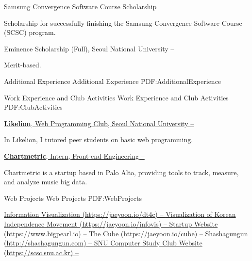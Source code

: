 \documentclass[letterpaper,MMMyyyy,nonstopmode]{template}
\begin{document}
\begin{Body}
\Gap
\BulletItem
Samsung Convergence Software Course Scholarship
\hfill
{}
\begin{Detail}
\Item
Scholarship for successfully finishing the Samsung Convergence Software Course (SCSC) program.
\end{Detail}

\Gap
\BulletItem
Eminence Scholarship (Full),
Seoul National University
\hfill
{} --
\begin{Detail}
\Item
Merit-based.
\end{Detail}


\Section
{Additional Experience}
{Additional Experience}
{PDF:AdditionalExperience}

\SubSection
{Work Experience and Club Activities}
{Work Experience and Club Activities}
{PDF:ClubActivities}

\BigGap
\BulletItem
\href{https://likelion.net}
{\textbf{Likelion}, Web Programming Club, Seoul National University
\hfill
{} --
}
\begin{Detail}
  \SubBulletItem
  In Likelion, I tutored peer students on basic web programming.
\end{Detail}

\Gap
\BulletItem
\href{https://chartmetric.io}
{\textbf{Chartmetric}, Intern, Front-end Engineering
\hfill
{} --
}
\begin{Detail}
  \SubBulletItem
  Chartmetric is a startup based in Palo Alto, providing tools to track, measure, and analyze music big data.
\end{Detail}

\BigGap
\SubSection
{Web Projects}
{Web Projects}
{PDF:WebProjects}

\BigGap
\BulletItem
\href{https://jaeyoon.io/dt4c}
{Information Visualization (https://jaeyoon.io/dt4c)
\hfill
{} --
}
\Gap
\BulletItem
\href{https://jaeyoon.io/infovis}
{Visualization of Korean Independence Movement (https://jaeyoon.io/infovis)
\hfill
{} --
}
\Gap
\BulletItem
\href{https://www.bigpearl.io/company}
{Startup Website (https://www.bigpearl.io)
\hfill
{} --
}
\Gap
\BulletItem
\href{https://jaeyoon.io}
{The Cube (https://jaeyoon.io/cube)
\hfill
{} --
}
\Gap
\BulletItem
\href{http://shashagungun.com}
{Shashagungun (http://shashagungun.com)
\hfill
{} --
}
\Gap
\BulletItem
\href{http://scsc.snu.ac.kr}
{SNU Computer Study Club Website (https://scsc.snu.ac.kr)
\hfill
{} --
}


\end{Body}
\end{document}
